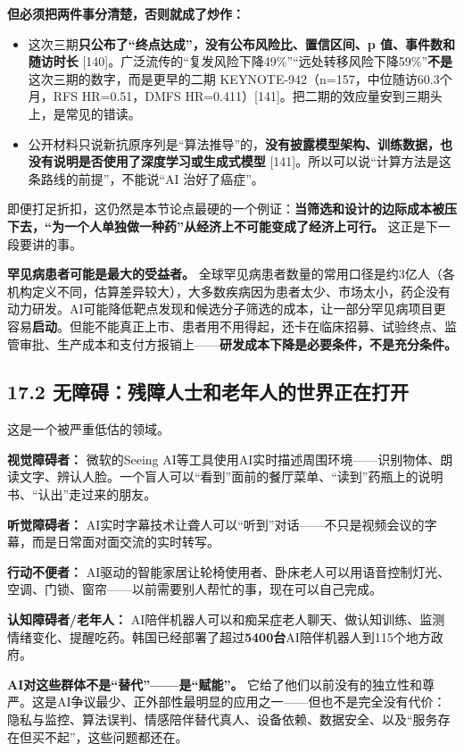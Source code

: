 \documentclass[11pt,a4paper]{ctexart}
\begin{document}
\textbf{但必须把两件事分清楚，否则就成了炒作：}

\begin{itemize}
  \item 这次三期\textbf{只公布了“终点达成”，没有公布风险比、置信区间、p 值、事件数和随访时长}{} [140]。广泛流传的“复发风险下降49\%”“远处转移风险下降59\%”\textbf{不是}这次三期的数字，而是更早的二期 KEYNOTE-942（n=157，中位随访60.3个月，RFS HR=0.51，DMFS HR=0.411）[141]。把二期的效应量安到三期头上，是常见的错读。
  \item 公开材料只说新抗原序列是“算法推导”的，\textbf{没有披露模型架构、训练数据，也没有说明是否使用了深度学习或生成式模型}{} [141]。所以可以说“计算方法是这条路线的前提”，不能说“AI 治好了癌症”。
\end{itemize}

即便打足折扣，这仍然是本节论点最硬的一个例证：\textbf{当筛选和设计的边际成本被压下去，“为一个人单独做一种药”从经济上不可能变成了经济上可行。} 这正是下一段要讲的事。

\textbf{罕见病患者可能是最大的受益者。} 全球罕见病患者数量的常用口径是约3亿人（各机构定义不同，估算差异较大），大多数疾病因为患者太少、市场太小，药企没有动力研发。AI可能降低靶点发现和候选分子筛选的成本，让一部分罕见病项目更容易\textbf{启动}。但能不能真正上市、患者用不用得起，还卡在临床招募、试验终点、监管审批、生产成本和支付方报销上——\textbf{研发成本下降是必要条件，不是充分条件。}

\subsection{17.2 无障碍：残障人士和老年人的世界正在打开}

这是一个被严重低估的领域。

\textbf{视觉障碍者：} 微软的Seeing AI等工具使用AI实时描述周围环境——识别物体、朗读文字、辨认人脸。一个盲人可以“看到”面前的餐厅菜单、“读到”药瓶上的说明书、“认出”走过来的朋友。

\textbf{听觉障碍者：} AI实时字幕技术让聋人可以“听到”对话——不只是视频会议的字幕，而是日常面对面交流的实时转写。

\textbf{行动不便者：} AI驱动的智能家居让轮椅使用者、卧床老人可以用语音控制灯光、空调、门锁、窗帘——以前需要别人帮忙的事，现在可以自己完成。

\textbf{认知障碍者/老年人：} AI陪伴机器人可以和痴呆症老人聊天、做认知训练、监测情绪变化、提醒吃药。韩国已经部署了超过\textbf{5400台}AI陪伴机器人到115个地方政府。

\textbf{AI对这些群体不是“替代”——是“赋能”。} 它给了他们以前没有的独立性和尊严。这是AI争议最少、正外部性最明显的应用之一——但也不是完全没有代价：隐私与监控、算法误判、情感陪伴替代真人、设备依赖、数据安全、以及“服务存在但买不起”，这些问题都还在。
\end{document}
